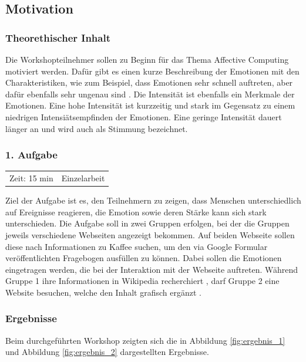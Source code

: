 \subsection{Motivation}
\subsubsection*{Theorethischer Inhalt}
Die Workshopteilnehmer sollen zu Beginn für das Thema Affective Computing motiviert werden. Dafür gibt es einen kurze Beschreibung der Emotionen mit den Charakteristiken, wie zum Beispiel, dass Emotionen sehr schnell auftreten, aber dafür ebenfalls sehr ungenau sind \cite{emotioneninfo}. Die Intensität ist ebenfalls ein Merkmale der Emotionen. Eine hohe Intensität ist kurzzeitig und stark im Gegensatz zu einem niedrigen Intensiätsempfinden der Emotionen. Eine geringe Intensität dauert länger an und wird auch als Stimmung bezeichnet. 

\vspace{3mm}
\subsubsection*{1. Aufgabe}	
\begin{tabular}{c c}
	Zeit: 15 min & Einzelarbeit\\
\end{tabular}
\vspace{1mm}

Ziel der Aufgabe ist es, den Teilnehmern zu zeigen, dass Menschen unterschiedlich auf Ereignisse reagieren, die Emotion sowie deren Stärke kann sich stark unterschieden. Die Aufgabe soll in zwei Gruppen erfolgen, bei der die Gruppen jeweils verschiedene Webseiten angezeigt bekommen. Auf beiden Webseite sollen diese nach Informationen zu Kaffee suchen, um den via Google Formular veröffentlichten Fragebogen ausfüllen zu können. Dabei sollen die Emotionen eingetragen werden, die bei der Interaktion mit der Webseite auftreten. Während Gruppe 1 ihre Informationen in Wikipedia recherchiert \cite{kaffeewiki}, darf Gruppe 2 eine Website besuchen, welche den Inhalt grafisch ergänzt \cite{kaffecss}. \newline


\subsubsection*{Ergebnisse}
Beim durchgeführten Workshop zeigten sich die in Abbildung \ref{fig:ergebnis_1} und Abbildung \ref{fig:ergebnis_2} dargestellten Ergebnisse.

